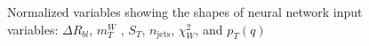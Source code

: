 \begin{figure}[h!]
\vspace{-4.5mm}
\hfil
{}
\caption{Normalized variables showing the shapes of neural network input variables: $\Delta R_{b l}$, $m_{T}^{W}$ , $S_T$, $n_{\text{jets}}$, $\chi^{2}_{W}$, and $p_T (q)$}
\label{fig:VarPlots2}
\end{figure}

